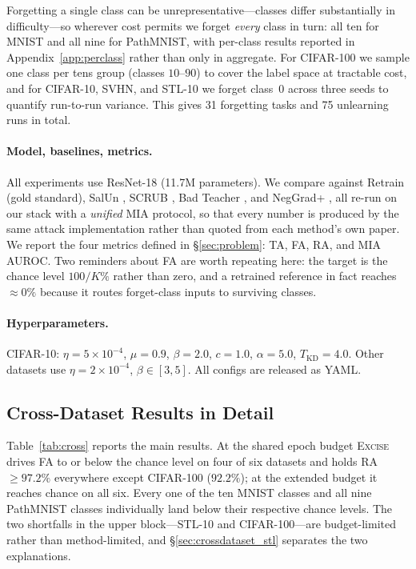 \documentclass{article}
\newcommand{\ours}{\textsc{Excise}}
\theoremstyle{remark}
\theoremstyle{plain}
\begin{document}
Forgetting a single class can be unrepresentative---classes differ substantially
in difficulty---so wherever cost permits we forget \emph{every} class in turn:
all ten for MNIST and all nine for PathMNIST, with per-class results reported in
Appendix~\ref{app:perclass} rather than only in aggregate. For CIFAR-100 we
sample one class per tens group (classes $10$--$90$) to cover the label space at
tractable cost, and for CIFAR-10, SVHN, and STL-10 we forget class~0 across
three seeds to quantify run-to-run variance. This gives 31 forgetting tasks and
75 unlearning runs in total.

\paragraph{Model, baselines, metrics.}
All experiments use ResNet-18 \citep{he2016resnet} (11.7M parameters). We
compare against Retrain (gold standard), SalUn \citep{fan2024salun}, SCRUB
\citep{kurmanji2023unbounded}, Bad Teacher \citep{chundawat2023badteacher}, and
NegGrad+ \citep{thudi2022unrolling}, all re-run on our stack with a
\emph{unified} MIA protocol, so that every number is produced by the same
attack implementation rather than quoted from each method's own paper. We report
the four metrics defined in \S\ref{sec:problem}: TA, FA, RA, and MIA AUROC. Two
reminders about FA are worth repeating here: the target is the chance level
$100/K\%$ rather than zero, and a retrained reference in fact reaches
${\approx}0\%$ because it routes forget-class inputs to surviving classes.

\paragraph{Hyperparameters.}
CIFAR-10: $\eta=5{\times}10^{-4}$, $\mu=0.9$, $\beta=2.0$, $c=1.0$,
$\alpha=5.0$, $T_{\mathrm{KD}}=4.0$. Other datasets use
$\eta=2{\times}10^{-4}$, $\beta\in[3,5]$. All configs are released as YAML.

\subsection{Cross-Dataset Results in Detail}\label{app:cross}

Table~\ref{tab:cross} reports the main results. At the shared epoch budget
\ours{} drives FA to or below the chance level on four of six datasets and holds
RA $\ge 97.2\%$ everywhere except CIFAR-100 ($92.2\%$); at the extended budget it
reaches chance on all six. Every one of the ten MNIST classes and all nine
PathMNIST classes individually land below their respective chance levels. The
two shortfalls in the upper block---STL-10 and CIFAR-100---are budget-limited
rather than method-limited, and \S\ref{sec:crossdataset_stl} separates the two
explanations.
\end{document}
